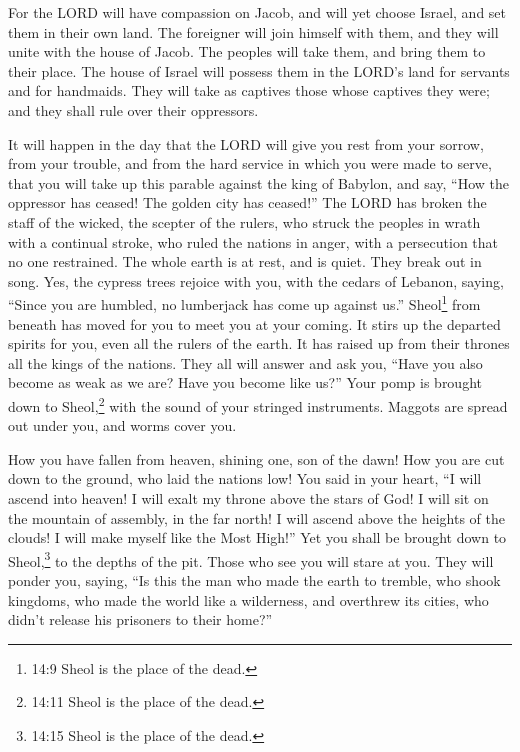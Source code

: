 \mychapter{} \myverse*{}For the LORD will have compassion on Jacob, and will yet choose
Israel, and set them in their own land. The foreigner will join himself with them, and they will unite
with the house of Jacob.
\myverse{}The peoples will take them, and bring them to their place. The house of Israel
will possess them in the LORD’s land for servants and for handmaids. They will take as captives those
whose captives they were; and they shall rule over their oppressors.

\myverse{}It will happen in the day that the LORD will give you rest from
your sorrow, from your trouble, and from the hard service in which you were made to serve,
\myverse{}that you will take up this parable against the king of Babylon, and say, “How
the oppressor has ceased! The golden city has ceased!”
\myverse{}The LORD has broken the staff of the wicked, the scepter of the rulers,
\myverse{}who struck the peoples in wrath with a continual stroke, who ruled the nations
in anger, with a persecution that no one restrained.
\myverse{}The whole earth is at rest, and is quiet. They break out in song.
\myverse{}Yes, the cypress trees rejoice with you, with the cedars of Lebanon, saying,
“Since you are humbled, no lumberjack has come up against us.”
\myverse{}Sheol\footnote{14:9 Sheol is the place of the dead.} from beneath has moved for you to meet you at your coming.
It stirs up the departed spirits for you, even all the rulers of the earth. It has raised up from their
thrones all the kings of the nations.
\myverse{}They all will answer and ask you, “Have you also become as weak as we are?
Have you become like us?”
\myverse{}Your pomp is brought down to Sheol,\footnote{14:11 Sheol is the place of the dead.
} with the sound of your stringed instruments. Maggots are spread out under you, and worms cover
you.

\myverse{}How you have fallen from heaven, shining one, son of the dawn!
How you are cut down to the ground, who laid the nations low!
\myverse{}You said in your heart, “I will ascend into heaven! I will exalt my throne
above the stars of God! I will sit on the mountain of assembly, in the far north!
\myverse{}I will ascend above the heights of the clouds! I will make myself like the
Most High!”
\myverse{}Yet you shall be brought down to Sheol,\footnote{14:15 Sheol is the place of the dead.} to the depths of the pit.
\myverse{}Those who see you will stare at you. They will ponder you, saying, “Is this
the man who made the earth to tremble, who shook kingdoms,
\myverse{}who made the world like a wilderness, and overthrew its cities, who didn’t
release his prisoners to their home?”

